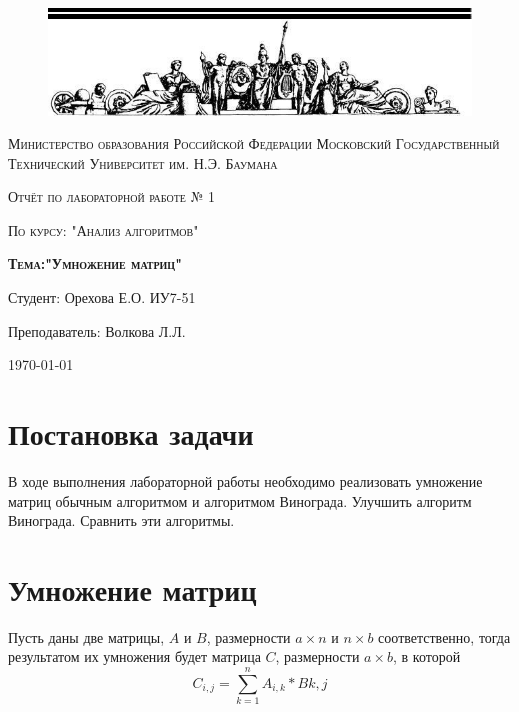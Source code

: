 \documentclass[a4paper,12pt]{article}
\begin{document}
\begin{titlepage}
	\centering
    \begin{figure}[H]
    	\includegraphics[scale=1.2]{photo}
   	\end{figure}
	{\scshape Министерство образования Российской Федерации
Московский Государственный Технический Университет им. Н.Э. Баумана \par}
	\vspace{4cm}
	{\scshape\Large Отчёт по лабораторной работе № 1\par}
    {\scshape\Large По курсу: "Анализ алгоритмов"\par}
	{\scshape\Large\bf Тема:"Умножение матриц"\par}
    \vspace{4cm}
    {\flushright Студент: Орехова Е.О. ИУ7-51\par
    \flushright Преподаватель: Волкова Л.Л.\par}
    \vspace{3cm}
	{\large \today\par}
\end{titlepage}

\def\contentaname{Содержание}
\tableofcontents %
\clearpage

\section{Постановка задачи}
    В ходе выполнения лабораторной работы необходимо реализовать умножение матриц обычным алгоритмом и алгоритмом Винограда. Улучшить алгоритм Винограда. Сравнить эти алгоритмы.

\section{Умножение матриц}
    Пусть даны две матрицы, $A$ и $B$, размерности $a \times n$ и $n \times b$ соответственно, тогда результатом их умножения будет матрица $C$, размерности $a \times b$, в которой
    \begin{equation}
    	C_{i,j} = \sum_{k = 1}^{n} A_{i,k}*B{k,j}
    \end{equation}
\end{document}
